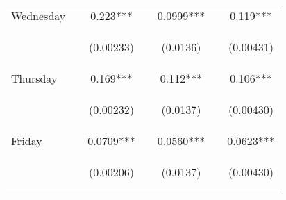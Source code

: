 \begin{center}
\begin{tabular}{lcccccc}
Wednesday &  & 0.223*** &  & 0.0999*** &  & 0.119*** \\
\vspace{4pt} & \begin{footnotesize}\end{footnotesize} & \begin{footnotesize}(0.00233)\end{footnotesize} & \begin{footnotesize}\end{footnotesize} & \begin{footnotesize}(0.0136)\end{footnotesize} & \begin{footnotesize}\end{footnotesize} & \begin{footnotesize}(0.00431)\end{footnotesize} \\
Thursday &  & 0.169*** &  & 0.112*** &  & 0.106*** \\
\vspace{4pt} & \begin{footnotesize}\end{footnotesize} & \begin{footnotesize}(0.00232)\end{footnotesize} & \begin{footnotesize}\end{footnotesize} & \begin{footnotesize}(0.0137)\end{footnotesize} & \begin{footnotesize}\end{footnotesize} & \begin{footnotesize}(0.00430)\end{footnotesize} \\
Friday &  & 0.0709*** &  & 0.0560*** &  & 0.0623*** \\
\vspace{4pt} & \begin{footnotesize}\end{footnotesize} & \begin{footnotesize}(0.00206)\end{footnotesize} & \begin{footnotesize}\end{footnotesize} & \begin{footnotesize}(0.0137)\end{footnotesize} & \begin{footnotesize}\end{footnotesize} & \begin{footnotesize}(0.00430)\end{footnotesize} \\

\end{tabular}
\end{center}
